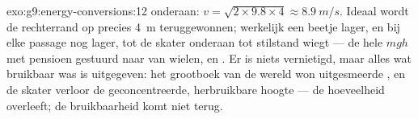 \begin{solution}{exo:g9:energy-conversions:12}
 onderaan: $v = \sqrt{2 \times 9.8 \times 4} \approx
\qty{8.9}{m/s}$. Ideaal wordt de rechterrand op precies \qty{4}{m}
teruggewonnen; werkelijk een beetje lager, en bij elke passage nog
lager, tot de skater onderaan tot stilstand wiegt --- de hele $m g h$
met pensioen gestuurd naar  van wielen,  en
. Er is niets vernietigd, maar alles wat bruikbaar was is
uitgegeven: het grootboek van de wereld won uitgesmeerde , en de
skater verloor de geconcentreerde, herbruikbare hoogte --- de
hoeveelheid overleeft; de bruikbaarheid komt niet terug.
\end{solution}

